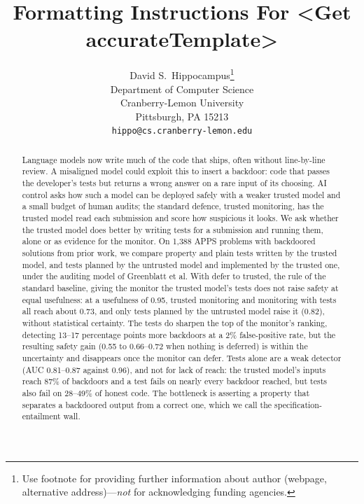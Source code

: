 \documentclass{article}
\title{Formatting Instructions For <Get accurateTemplate>}
\author{%
  David S.~Hippocampus\thanks{Use footnote for providing further information
    about author (webpage, alternative address)---\emph{not} for acknowledging
    funding agencies.} \\
  Department of Computer Science\\
  Cranberry-Lemon University\\
  Pittsburgh, PA 15213 \\
  \texttt{hippo@cs.cranberry-lemon.edu} \\
}
\begin{document}
\maketitle


\begin{abstract}
Language models now write much of the code that ships, often without line-by-line review. A misaligned model could exploit this to insert a backdoor: code that passes the developer's tests but returns a wrong answer on a rare input of its choosing. AI control asks how such a model can be deployed safely with a weaker trusted model and a small budget of human audits; the standard defence, trusted monitoring, has the trusted model read each submission and score how suspicious it looks. We ask whether the trusted model does better by writing tests for a submission and running them, alone or as evidence for the monitor. On 1,388 APPS problems with backdoored solutions from prior work, we compare property and plain tests written by the trusted model, and tests planned by the untrusted model and implemented by the trusted one, under the auditing model of Greenblatt et al. With defer to trusted, the rule of the standard baseline, giving the monitor the trusted model's tests does not raise safety at equal usefulness: at a usefulness of 0.95, trusted monitoring and monitoring with tests all reach about 0.73, and only tests planned by the untrusted model raise it (0.82), without statistical certainty. The tests do sharpen the top of the monitor's ranking, detecting 13--17 percentage points more backdoors at a 2\% false-positive rate, but the resulting safety gain (0.55 to 0.66--0.72 when nothing is deferred) is within the uncertainty and disappears once the monitor can defer. Tests alone are a weak detector (AUC 0.81--0.87 against 0.96), and not for lack of reach: the trusted model's inputs reach 87\% of backdoors and a test fails on nearly every backdoor reached, but tests also fail on 28--49\% of honest code. The bottleneck is asserting a property that separates a backdoored output from a correct one, which we call the specification-entailment wall.
\end{abstract}






\end{document}
